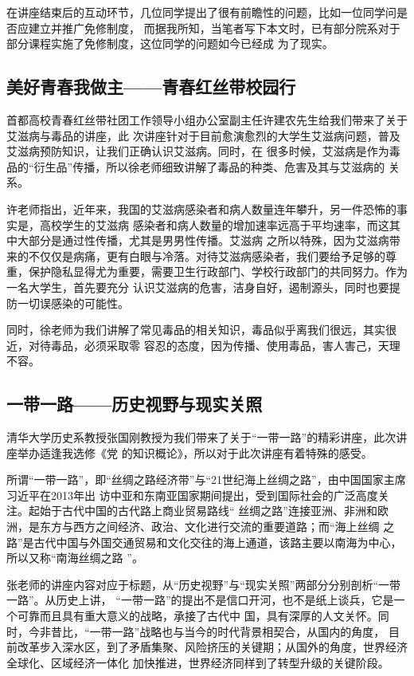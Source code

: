 \documentclass[a4paper]{cctart}
\numberwithin{equation}{section} \pagestyle{fancy}
\begin{document}
在讲座结束后的互动环节，几位同学提出了很有前瞻性的问题，比如一位同学问是否应建立并推广免修制度，
而据我所知，当笔者写下本文时，已有部分院系对于部分课程实施了免修制度，这位同学的问题如今已经成
为了现实。
\subsection{美好青春我做主——青春红丝带校园行}
首都高校青春红丝带社团工作领导小组办公室副主任许建农先生给我们带来了关于艾滋病与毒品的讲座，此
次讲座针对于目前愈演愈烈的大学生艾滋病问题，普及艾滋病预防知识，让我们正确认识艾滋病。同时，在
很多时候，艾滋病是作为毒品的“衍生品”传播，所以徐老师细致讲解了毒品的种类、危害及其与艾滋病的
关系。

许老师指出，近年来，我国的艾滋病感染者和病人数量连年攀升，另一件恐怖的事实是，高校学生的艾滋病
感染者和病人数量的增加速率远高于平均速率，而这其中大部分是通过性传播，尤其是男男性传播。艾滋病
之所以特殊，因为艾滋病带来的不仅仅是病痛，更有白眼与冷落。对待艾滋病感染者，我们要给予足够的尊
重，保护隐私显得尤为重要，需要卫生行政部门、学校行政部门的共同努力。作为一名大学生，首先要充分
认识艾滋病的危害，洁身自好，遏制源头，同时也要提防一切误感染的可能性。

同时，徐老师为我们讲解了常见毒品的相关知识，毒品似乎离我们很远，其实很近，对待毒品，必须采取零
容忍的态度，因为传播、使用毒品，害人害己，天理不容。
\subsection{一带一路——历史视野与现实关照}
清华大学历史系教授张国刚教授为我们带来了关于“一带一路”的精彩讲座，此次讲座举办适逢我选修《党
的知识概论》，所以对于此次讲座有着特殊的感受。

所谓“一带一路”，即“丝绸之路经济带”与“21世纪海上丝绸之路”，由中国国家主席习近平在2013年出
访中亚和东南亚国家期间提出，受到国际社会的广泛高度关注。起始于古代中国的古代路上商业贸易路线“
丝绸之路”连接亚洲、非洲和欧洲，是东方与西方之间经济、政治、文化进行交流的重要道路；而“海上丝绸
之路”是古代中国与外国交通贸易和文化交往的海上通道，该路主要以南海为中心，所以又称“南海丝绸之路
”。

张老师的讲座内容对应于标题，从“历史视野”与“现实关照”两部分分别剖析“一带一路”。从历史上讲，
“一带一路”的提出不是信口开河，也不是纸上谈兵，它是一个可靠而且具有重大意义的战略，承接了古代中
国，具有深厚的人文关怀。同时，今非昔比，“一带一路”战略也与当今的时代背景相契合，从国内的角度，
目前改革步入深水区，到了矛盾集聚、风险挤压的关键期；从国外的角度，世界经济全球化、区域经济一体化
加快推进，世界经济同样到了转型升级的关键阶段。
\end{document}
